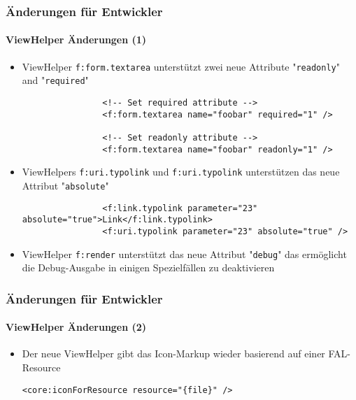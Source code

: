 \begin{frame}[fragile]
	\frametitle{Änderungen für Entwickler}
	\framesubtitle{ViewHelper Änderungen (1)}

	\lstset{basicstyle=\tiny\ttfamily}

	\begin{itemize}
		\item ViewHelper \texttt{f:form.textarea} unterstützt zwei neue Attribute\newline
			 "\texttt{readonly}" and "\texttt{required}"

			\begin{lstlisting}
				<!-- Set required attribute -->
				<f:form.textarea name="foobar" required="1" />

				<!-- Set readonly attribute -->
				<f:form.textarea name="foobar" readonly="1" />
			\end{lstlisting}

		\item ViewHelpers \texttt{f:uri.typolink} und \texttt{f:uri.typolink} unterstützen das neue
			Attribut "\texttt{absolute}"

			\begin{lstlisting}
				<f:link.typolink parameter="23" absolute="true">Link</f:link.typolink>
				<f:uri.typolink parameter="23" absolute="true" />
			\end{lstlisting}

		\item ViewHelper \texttt{f:render} unterstützt das neue Attribut "\texttt{debug}"
			das ermöglicht die Debug-Ausgabe in einigen Spezielfällen zu deaktivieren

	\end{itemize}

\end{frame}


\begin{frame}[fragile]
	\frametitle{Änderungen für Entwickler}
	\framesubtitle{ViewHelper Änderungen (2)}

	\lstset{basicstyle=\tiny\ttfamily}

	\begin{itemize}
		\item Der neue ViewHelper gibt das Icon-Markup wieder basierend auf einer FAL-Resource


			\smaller
				\texttt{<core:iconForResource resource="\{file\}" />}
			\normalsize

	\end{itemize}

\end{frame}

